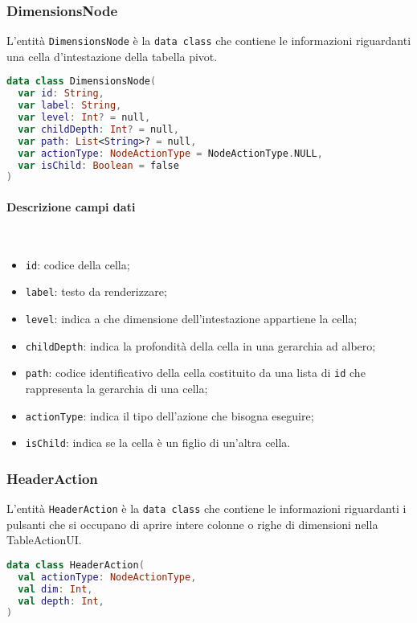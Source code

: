 \subsubsection{DimensionsNode}
L'entità \verb|DimensionsNode| è la \verb|data class| che contiene le informazioni riguardanti una cella d'intestazione della tabella pivot.
\begin{lstlisting}[caption={DimensionsNode}, label={lst:dimensionsnode}, language=Kotlin]
data class DimensionsNode(
  var id: String,
  var label: String,
  var level: Int? = null,
  var childDepth: Int? = null,
  var path: List<String>? = null,
  var actionType: NodeActionType = NodeActionType.NULL,
  var isChild: Boolean = false
)
\end{lstlisting}
\paragraph{Descrizione campi dati} \mbox{} \\
\begin{itemize}
	\item \verb|id|: codice della cella;
	\item \verb|label|: testo da renderizzare;
	\item \verb|level|: indica a che dimensione dell'intestazione appartiene la cella;
	\item \verb|childDepth|: indica la profondità della cella in una gerarchia ad albero;
	\item \verb|path|: codice identificativo della cella costituito da una lista di \verb|id| che rappresenta la gerarchia di una cella;
	\item \verb|actionType|: indica il tipo dell'azione che bisogna eseguire;
	\item \verb|isChild|: indica se la cella è un figlio di un'altra cella.
\end{itemize}

\subsubsection{HeaderAction}
L'entità \verb|HeaderAction| è la \verb|data class| che contiene le informazioni riguardanti i pulsanti che si occupano di aprire intere colonne o righe di dimensioni nella TableActionUI.
\begin{lstlisting}[caption={HeaderAction}, label={lst:headeraction}, language=Kotlin]
data class HeaderAction(
  val actionType: NodeActionType,
  val dim: Int,
  val depth: Int,
)
\end{lstlisting}
